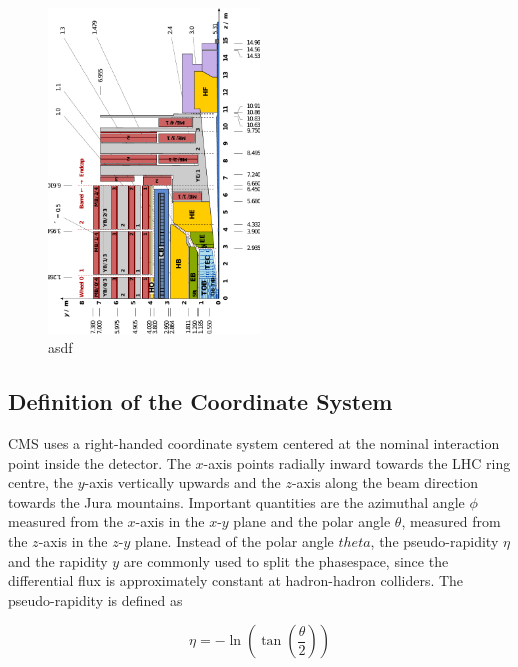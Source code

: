 \begin{figure}[htb]
    \centering
    \includegraphics[width=0.5\textwidth]{figures/cms_detector/cms_longitudinal_section.pdf}
    \caption[Longitudinal section of the CMS detector]{asdf}
    \label{fig:cms:longitudinal_section}
\end{figure}


\subsection{Definition of the Coordinate System}

CMS uses a right-handed coordinate system centered at the nominal interaction point inside the
detector. The $x$-axis points radially inward towards the LHC ring centre, the
$y$-axis vertically upwards and the $z$-axis along the beam direction towards
the Jura mountains. Important quantities are the azimuthal angle $\phi$
measured from the $x$-axis in the $x$-$y$ plane and the polar angle $\theta$,
measured from the $z$-axis in the $z$-$y$ plane. Instead of the polar angle
$theta$, the pseudo-rapidity $\eta$ and the rapidity $y$ are commonly used to
split the phasespace, since the differential flux is approximately constant at
hadron-hadron colliders. The pseudo-rapidity is defined as

\begin{equation}
    \eta = - \ln \left( \tan \left( \frac{\theta}{2} \right) \right)
\end{equation}

